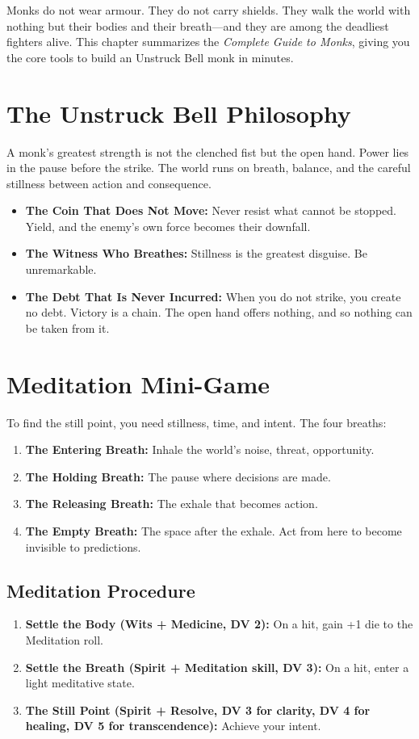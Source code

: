 \documentclass[9pt,a5paper]{extbook}
\begin{document}
Monks do not wear armour. They do not carry shields. They walk the world with nothing but their bodies and their breath---and they are among the deadliest fighters alive. This chapter summarizes the \textit{Complete Guide to Monks}, giving you the core tools to build an Unstruck Bell monk in minutes.

\section{The Unstruck Bell Philosophy}

A monk's greatest strength is not the clenched fist but the open hand. Power lies in the pause before the strike. The world runs on breath, balance, and the careful stillness between action and consequence.

\begin{itemize}
    \item \textbf{The Coin That Does Not Move:} Never resist what cannot be stopped. Yield, and the enemy's own force becomes their downfall.
    \item \textbf{The Witness Who Breathes:} Stillness is the greatest disguise. Be unremarkable.
    \item \textbf{The Debt That Is Never Incurred:} When you do not strike, you create no debt. Victory is a chain. The open hand offers nothing, and so nothing can be taken from it.
\end{itemize}

\section{Meditation Mini-Game}

To find the still point, you need stillness, time, and intent. The four breaths:

\begin{enumerate}
    \item \textbf{The Entering Breath:} Inhale the world's noise, threat, opportunity.
    \item \textbf{The Holding Breath:} The pause where decisions are made.
    \item \textbf{The Releasing Breath:} The exhale that becomes action.
    \item \textbf{The Empty Breath:} The space after the exhale. Act from here to become invisible to predictions.
\end{enumerate}

\subsection*{Meditation Procedure}
\begin{enumerate}
    \item \textbf{Settle the Body (Wits + Medicine, DV 2):} On a hit, gain +1 die to the Meditation roll.
    \item \textbf{Settle the Breath (Spirit + Meditation skill, DV 3):} On a hit, enter a light meditative state.
    \item \textbf{The Still Point (Spirit + Resolve, DV 3 for clarity, DV 4 for healing, DV 5 for transcendence):} Achieve your intent.
\end{enumerate}
\end{document}
